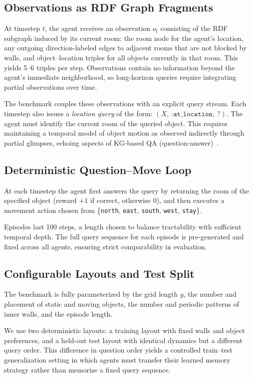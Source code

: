 \documentclass[Afour,sageh,times]{sagej}
\begin{document}
\subsection{Observations as RDF Graph Fragments}

At timestep $t$, the agent receives an observation $o_t$ consisting of the RDF subgraph
induced by its current room: the room node for the agent’s location, any outgoing
direction-labeled edges to adjacent rooms that are not blocked by walls, and
object–location triples for all objects currently in that room. This yields 5–6 triples
per step. Observations contain no information beyond the agent’s immediate neighborhood,
so long-horizon queries require integrating partial observations over time.

The benchmark couples these observations with an explicit query stream.
Each timestep also issues a \emph{location query} of the form: $(X,\
\texttt{:at\_location},\ ?)$. The agent must identify the current room of the queried
object. This requires maintaining a
temporal model of object motion as observed indirectly through partial glimpses, echoing
aspects of KG-based QA (question-answer)~\citep{yih-etal-2015-semantic}.

\subsection{Deterministic Question–Move Loop}

At each timestep the agent first answers the query by returning the room of the
specified object (reward $+1$ if correct, otherwise $0$), and then executes a movement
action chosen from \{\texttt{north}, \texttt{east}, \texttt{south}, \texttt{west},
\texttt{stay}\}.

Episodes last 100 steps, a length chosen to balance tractability with sufficient
temporal depth. The full query sequence for each episode is pre-generated and fixed
across all agents, ensuring strict comparability in evaluation.

\subsection{Configurable Layouts and Test Split}

The benchmark is fully parameterized by the grid length $g$, the number and placement
of static and moving objects, the number and periodic patterns of inner walls, and the
episode length.

We use two deterministic layouts: a training layout with fixed walls and object
preferences, and a held-out test layout with identical dynamics but a different query
order. This difference in question order yields a controlled train–test generalization
setting in which agents must transfer their learned memory strategy rather than memorize
a fixed query sequence.
\end{document}
